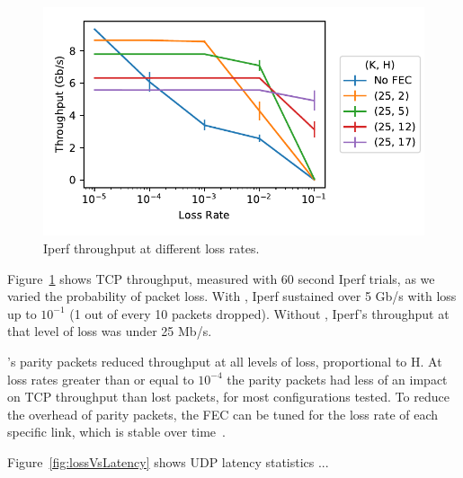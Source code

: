 \begin{figure}
  \centering
  \includegraphics[width=0.3\paperwidth]{figures/lossVsTput.pdf}
  \caption{\label{fig:lossVsTput} Iperf throughput at different loss rates.}
\end{figure}

Figure~\ref{fig:lossVsTput} shows TCP throughput, measured with 60 second Iperf 
trials, as we varied the probability of packet loss. With \OurSys, Iperf sustained 
over 5 Gb/s with loss up to $10^{-1}$ (1 out of every 10 packets dropped). Without 
\OurSys, Iperf's throughput at that level of loss was under 25 Mb/s. 

\OurSys's parity packets reduced throughput at all levels of loss, 
proportional to H. At loss rates greater than or equal to $10^{-4}$ the 
parity packets had less of an impact on TCP throughput than lost packets, for 
most configurations tested. To reduce the overhead of parity packets, the FEC 
can be tuned for the loss rate of each specific link, which is 
stable over time~\cite{corropt}.


Figure~\ref{fig:lossVsLatency} shows UDP latency statistics ...

